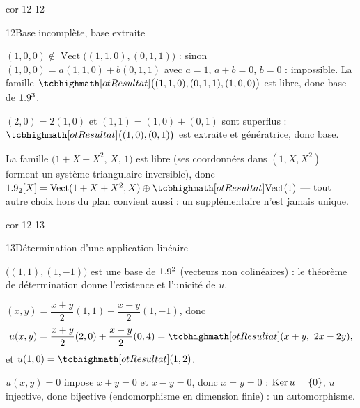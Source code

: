 \begin{blocLivre}{cor-12-12}
\begin{corrige}{12}{Base incomplète, base extraite}
\begin{questions}
  \item $(1,0,0)\notin\operatorname{Vect}\bigl((1,1,0),(0,1,1)\bigr)$ :
    sinon $(1,0,0)=a(1,1,0)+b(0,1,1)$ avec $a=1$, $a+b=0$, $b=0$ :
    impossible. La famille $\res{\bigl((1,1,0),(0,1,1),(1,0,0)\bigr)}$ est
    libre, donc base de $1.9^{3}$.
  \item $(2,0)=2(1,0)$ et $(1,1)=(1,0)+(0,1)$ sont superflus :
    $\res{\bigl((1,0),(0,1)\bigr)}$ est extraite et génératrice, donc base.
  \item La famille $\bigl(1+X+X^{2},\,X,\,1\bigr)$ est libre (ses
    coordonnées dans $(1,X,X^{2})$ forment un système triangulaire
    inversible), donc $\R_2[X]=\operatorname{Vect}(1+X+X^{2},X)\oplus
    \res{\operatorname{Vect}(1)}$ — tout autre choix hors du plan convient
    aussi : un supplémentaire n'est jamais unique.
\end{questions}
\end{corrige}
\end{blocLivre}

\begin{blocLivre}{cor-12-13}
\begin{corrige}{13}{Détermination d'une application linéaire}
\begin{questions}
  \item $\bigl((1,1),(1,-1)\bigr)$ est une base de $1.9^{2}$ (vecteurs non
    colinéaires) : le théorème de détermination donne l'existence et
    l'unicité de $u$.
  \item $(x,y)=\dfrac{x+y}{2}(1,1)+\dfrac{x-y}{2}(1,-1)$, donc
    \[
    u(x,y)=\frac{x+y}{2}(2,0)+\frac{x-y}{2}(0,4)
    =\res{(x+y,\ 2x-2y)},
    \]
    et $u(1,0)=\res{(1,2)}$.
  \item $u(x,y)=0$ impose $x+y=0$ et $x-y=0$, donc $x=y=0$ :
    $\operatorname{Ker}u=\left\{0\right\}$, $u$ injective, donc bijective
    (endomorphisme en dimension finie) : un automorphisme.
\end{questions}
\end{corrige}
\end{blocLivre}

